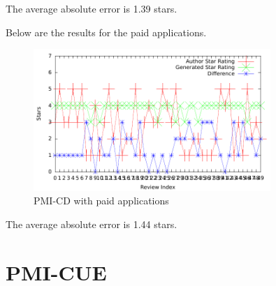 \documentclass[11pt]{report} %
\begin{document}
The average absolute error is 1.39 stars.

Below are the results for the paid applications.
	
	\begin{figure}[H]
	\centering
	\includegraphics[width=0.8\textwidth]{data/pmi-cd-paid.pdf}
	\caption{PMI-CD with paid applications}
	\label{fig:pmi-cd-paid}
	\end{figure}

The average absolute error is 1.44 stars.


	\section{PMI-CUE}
\end{document}
